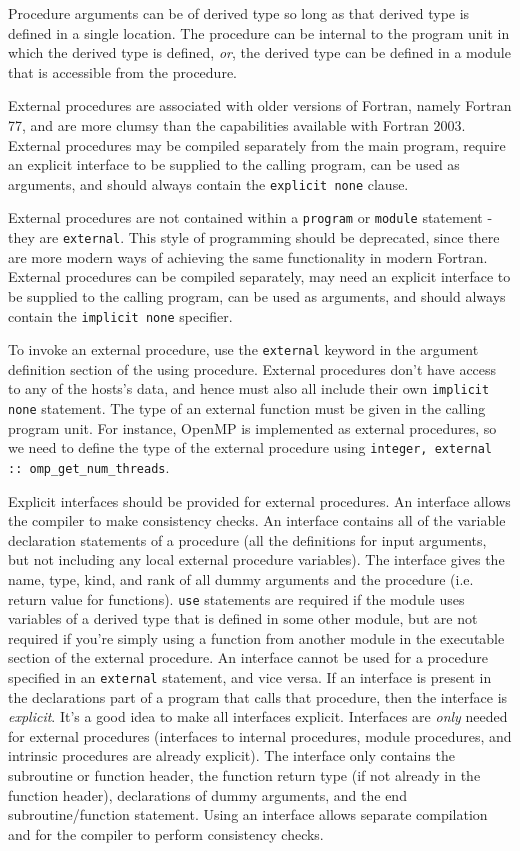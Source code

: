 \documentclass[10pt]{article}
\begin{document}
Procedure arguments can be of derived type so long as that derived type is defined in a single location. The procedure can be internal to the program unit in which the derived type is defined, {\it or}, the derived type can be defined in a module that is accessible from the procedure. 

External procedures are associated with older versions of Fortran, namely Fortran 77, and are more clumsy than the capabilities available with Fortran 2003. External procedures may be compiled separately from the main program, require an explicit interface to be supplied to the calling program, can be used as arguments, and should always contain the {\tt explicit none} clause. 

External procedures are not contained within a {\tt program} or {\tt module} statement - they are {\tt external}. This style of programming should be deprecated, since there are more modern ways of achieving the same functionality in modern Fortran. External procedures can be compiled separately, may need an explicit interface to be supplied to the calling program, can be used as arguments, and should always contain the {\tt implicit none} specifier. 

To invoke an external procedure, use the {\tt external} keyword in the argument definition section of the using procedure. External procedures don't have access to any of the hosts's data, and hence must also all include their own {\tt implicit none} statement. The type of an external function must be given in the calling program unit. For instance, OpenMP is implemented as external procedures, so we need to define the type of the external procedure using {\tt integer, external :: omp\_get\_num\_threads}.

Explicit interfaces should be provided for external procedures. An interface allows the compiler to make consistency checks. An interface contains all of the variable declaration statements of a procedure (all the definitions for input arguments, but not including any local external procedure variables). The interface gives the name, type, kind, and rank of all dummy arguments and the procedure (i.e. return value for functions). {\tt use} statements are required if the module uses variables of a derived type that is defined in some other module, but are not required if you're simply using a function from another module in the executable section of the external procedure. An interface cannot be used for a procedure specified in an {\tt external} statement, and vice versa. If an interface is present in the declarations part of a program that calls that procedure, then the interface is {\it explicit}. It's a good idea to make all interfaces explicit. Interfaces are {\it only} needed for external procedures (interfaces to internal procedures, module procedures, and intrinsic procedures are already explicit). The interface only contains the subroutine or function header, the function return type (if not already in the function header), declarations of dummy arguments, and the end subroutine/function statement. Using an interface allows separate compilation and for the compiler to perform consistency checks.
\end{document}

